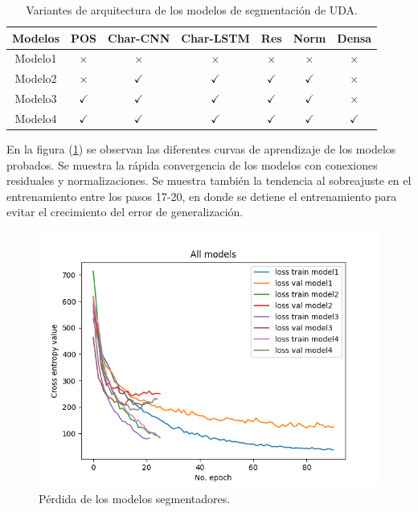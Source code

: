 \begin{table}[h!]
	\begin{center}
		\begin{tabular}{|c|c|c|c|c|c|c|} \hline
		Modelos 	& POS       & Char-CNN  & Char-LSTM & Res       & Norm      & Densa  \\ \hline
		Modelo1		& $\times$	& $\times$    & $\times$    & $\times$	& $\times$    & $\times$ \\ \hline
		Modelo2		& $\times$	& $\checkmark$    & $\checkmark$    & $\checkmark$	& $\checkmark$    & $\times$ \\ \hline
		Modelo3		& $\checkmark$	& $\checkmark$    & $\checkmark$    & $\checkmark$	& $\checkmark$    & $\times$ \\ \hline
		Modelo4		& $\checkmark$	& $\checkmark$    & $\checkmark$    & $\checkmark$	& $\checkmark$    & $\checkmark$ \\ \hline
		\end{tabular}
	\caption{Variantes de arquitectura de los modelos de segmentación de UDA.}\label{table:segmenter_architecture_table}
	\end{center}
\end{table}

En la figura (\ref{fig:segmenter_model_loss}) se observan las diferentes curvas de aprendizaje de los modelos 
probados. Se muestra la rápida convergencia de los modelos con conexiones residuales y normalizaciones.
Se muestra también la tendencia al sobreajuste en el entrenamiento entre los pasos 17-20, en donde se detiene el 
entrenamiento para evitar el crecimiento del error de generalización.

\begin{figure}[h!]
	\begin{center}
		\begin{center}
			\includegraphics[scale=.7]{Graphics/persuasive_essays_all_linked_crf_loss.png}
        \end{center}
	    \caption{Pérdida de los modelos segmentadores.}\label{fig:segmenter_model_loss}
	\end{center}
\end{figure}

